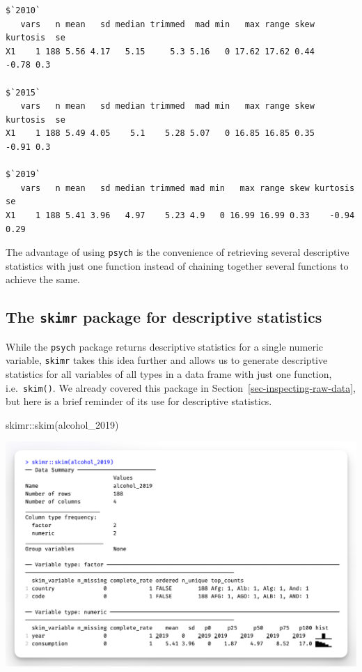 \documentclass[
  letterpaper,
]{krantz}
\makeatletter
\newenvironment{Shaded}{\begin{snugshade}}{\end{snugshade}}
\newcommand{\FunctionTok}[1]{\textcolor[rgb]{0.28,0.35,0.67}{#1}}
\newcommand{\NormalTok}[1]{\textcolor[rgb]{0.00,0.23,0.31}{#1}}
\newcommand{\SpecialCharTok}[1]{\textcolor[rgb]{0.37,0.37,0.37}{#1}}
\newenvironment{kframe}{%
\medskip{}
\setlength{\fboxsep}{.8em}
 \def\at@end@of@kframe{}%
 \ifinner\ifhmode%
  \def\at@end@of@kframe{\end{minipage}}%
  \begin{minipage}{\columnwidth}%
 \fi\fi%
 \def\FrameCommand##1{\hskip\@totalleftmargin \hskip-\fboxsep
 \colorbox{shadecolor}{##1}\hskip-\fboxsep
     \hskip-\linewidth \hskip-\@totalleftmargin \hskip\columnwidth}%
 \MakeFramed {\advance\hsize-\width
   \@totalleftmargin\z@ \linewidth\hsize
   \@setminipage}}%
 {\par\unskip\endMakeFramed%
 \at@end@of@kframe}
\renewenvironment{Shaded}{\begin{kframe}}{\end{kframe}}
\makeatother
\begin{document}
\begin{verbatim}
$`2010`
   vars   n mean   sd median trimmed  mad min   max range skew kurtosis  se
X1    1 188 5.56 4.17   5.15     5.3 5.16   0 17.62 17.62 0.44    -0.78 0.3

$`2015`
   vars   n mean   sd median trimmed  mad min   max range skew kurtosis  se
X1    1 188 5.49 4.05    5.1    5.28 5.07   0 16.85 16.85 0.35    -0.91 0.3

$`2019`
   vars   n mean   sd median trimmed mad min   max range skew kurtosis   se
X1    1 188 5.41 3.96   4.97    5.23 4.9   0 16.99 16.99 0.33    -0.94 0.29
\end{verbatim}

The advantage of using \texttt{psych} is the convenience of retrieving
several descriptive statistics with just one function instead of
chaining together several functions to achieve the same.

\subsection{\texorpdfstring{The \texttt{skimr} package for descriptive
statistics}{The skimr package for descriptive statistics}}\label{sec-skimr-package}

While the \texttt{psych} package returns descriptive statistics for a
single numeric variable, \texttt{skimr} takes this idea further and
allows us to generate descriptive statistics for all variables of all
types in a data frame with just one function, i.e.~\texttt{skim()}. We
already covered this package in Section~\ref{sec-inspecting-raw-data},
but here is a brief reminder of its use for descriptive statistics.

\begin{Shaded}
\begin{Highlighting}[]
\NormalTok{skimr}\SpecialCharTok{::}\FunctionTok{skim}\NormalTok{(alcohol\_2019)}
\end{Highlighting}
\end{Shaded}

\includegraphics{images/chapter_08_img/output_skim.png}
\end{document}
